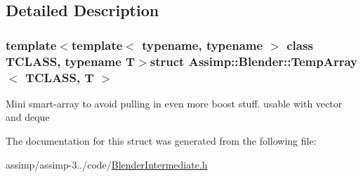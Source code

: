 \subsection{Detailed Description}
\subsubsection*{template$<$template$<$ typename, typename $>$ class T\+C\+L\+A\+S\+S, typename T$>$struct Assimp\+::\+Blender\+::\+Temp\+Array$<$ T\+C\+L\+A\+S\+S, T $>$}

Mini smart-\/array to avoid pulling in even more boost stuff. usable with vector and deque 

The documentation for this struct was generated from the following file\+:\begin{DoxyCompactItemize}
\item 
assimp/assimp-\/3../code/\hyperlink{_blender_intermediate_8h}{Blender\+Intermediate.\+h}\end{DoxyCompactItemize}
